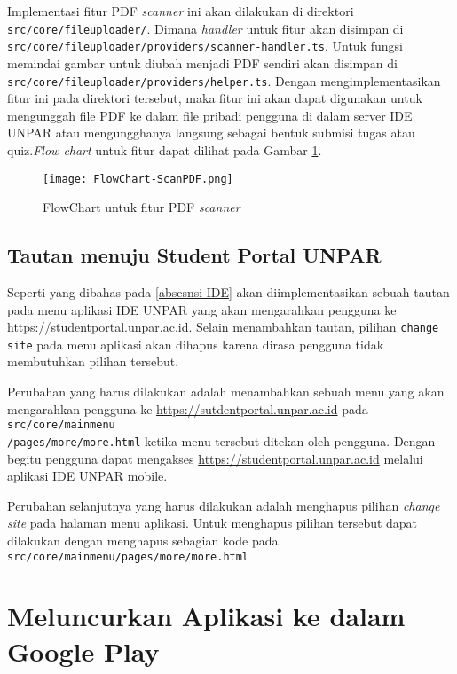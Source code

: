 Implementasi fitur PDF \textit{scanner} ini akan dilakukan di direktori \texttt{src/core/fileuploader/}. Dimana \textit{handler} untuk fitur akan disimpan di \texttt{src/core/fileuploader/providers/scanner-handler.ts}. Untuk fungsi memindai gambar untuk diubah menjadi PDF sendiri akan disimpan di \\ \texttt{src/core/fileuploader/providers/helper.ts}. Dengan mengimplementasikan fitur ini pada direktori tersebut, maka fitur ini akan dapat digunakan untuk mengunggah file PDF ke dalam file pribadi pengguna di dalam server IDE UNPAR atau mengungghanya langsung sebagai bentuk submisi tugas atau quiz.\textit{Flow chart} untuk fitur dapat dilihat pada Gambar \ref{fig:scan:flowchart}. 

\begin{figure}[H] 
	\centering  
	\texttt{[image: FlowChart-ScanPDF.png]}  
	\caption[FlowChart untuk fitur PDF \textit{scanner}] {FlowChart untuk fitur PDF \textit{scanner}} 
	\label{fig:scan:flowchart} 
\end{figure} 

\subsection{Tautan menuju Student Portal UNPAR}
\label{feat:menu:link}
Seperti yang dibahas pada \ref{absesnsi IDE} akan diimplementasikan sebuah tautan pada menu aplikasi IDE UNPAR yang akan mengarahkan pengguna ke \url{https://studentportal.unpar.ac.id}. Selain menambahkan tautan, pilihan \texttt{change site} pada menu aplikasi akan dihapus karena dirasa pengguna tidak membutuhkan pilihan tersebut.

Perubahan yang harus dilakukan adalah menambahkan sebuah menu yang akan mengarahkan pengguna ke \url{https://sutdentportal.unpar.ac.id} pada \texttt{src/core/mainmenu\\/pages/more/more.html} ketika menu tersebut ditekan oleh pengguna. Dengan begitu pengguna dapat mengakses \url{https://studentportal.unpar.ac.id} melalui aplikasi IDE UNPAR mobile.

Perubahan selanjutnya yang harus dilakukan adalah menghapus pilihan \textit{change site} pada halaman menu aplikasi. Untuk menghapus pilihan tersebut dapat dilakukan dengan menghapus sebagian kode pada \texttt{src/core/mainmenu/pages/more/more.html}

\section{Meluncurkan Aplikasi ke dalam Google Play}

